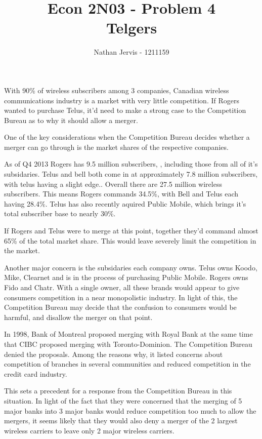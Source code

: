 \documentclass[12pt]{article}
\title{\vspace{-2.5cm}Econ 2N03 - Problem 4\\Telgers}
\author{Nathan Jervis - 1211159}
\begin{document}
\maketitle


With 90\% of wireless subscribers among 3 companies\cite{subStats}, Canadian wireless communications industry is a market with very little competition. If Rogers wanted to purchase Telus, it'd need to make a strong case to the Competition Bureau as to why it should allow a merger.

One of the key considerations when the Competition Bureau decides whether a merger can go through is the market shares of the respective companies\cite[VII 92.1]{compAct}. 

As of Q4 2013 Rogers has 9.5 million subscribers, \cite[Wireless - Subscriber Results]{rogersSub}, including those from all of it's subsidaries. Telus and bell both come in at approximately 7.8 million subscribers, with telus having a slight edge.\cite{telusSub}\cite{bellSub}\cite{subStats}. Overall there are 27.5 million wireless subscribers\cite{subStats}. This means Rogers commands 34.5\%, with Bell and Telus each having 28.4\%. Telus has also recently aquired Public Mobile\cite{telPublic}, which brings it's total subscriber base to nearly 30\%.

If Rogers and Telus were to merge at this point, together they'd command almost 65\% of the total market share. This would leave severely limit the competition in the market.

Another major concern is the subsidaries each company owns. Telus owns Koodo, Mike, Clearnet and is in the process of purchasing Public Mobile. Rogers owns Fido and Chatr. With a single owner, all these brands would appear to give consumers competition in a near monopolistic industry. In light of this, the Competition Bureau may decide that the confusion to consumers would be harmful, and disallow the merger on that point.

In 1998, Bank of Montreal proposed merging with Royal Bank at the same time that CIBC proposed merging with Toronto-Dominion.\cite[250]{bankMergers} The Competition Bureau denied the proposals\cite{letterBanks}. Among the reasons why, it listed concerns about competition of branches in several communities and reduced competition in the credit card industry.\cite[Summary of Conclusions A \& B]{letterBanks}

This sets a precedent for a response from the Competition Bureau in this situation. In light of the fact that they were concerned that the merging of 5 major banks into 3 major banks would reduce competition too much to allow the mergers, it seems likely that they would also deny a merger of the 2 largest wireless carriers to leave only 2 major wireless carriers.
\end{document}
